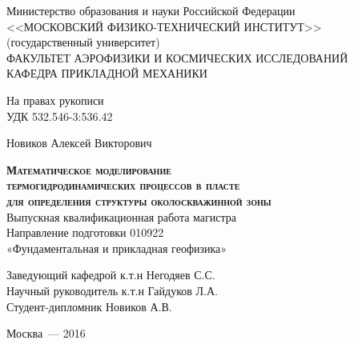 \begin{titlepage}
\newpage

\begin{center}
	Министерство образования и науки Российской Федерации \\
	<<МОСКОВСКИЙ ФИЗИКО-ТЕХНИЧЕСКИЙ ИНСТИТУТ>>\\(государственный университет)\\[0.5cm]
	ФАКУЛЬТЕТ АЭРОФИЗИКИ И КОСМИЧЕСКИХ ИССЛЕДОВАНИЙ\\
	КАФЕДРА ПРИКЛАДНОЙ МЕХАНИКИ\\
\end{center}

\vspace{0.5em}

\begin{flushright}
На правах рукописи \\
УДК 532.546-3:536.42
\end{flushright}

\vspace{1em}

\begin{center}
	Новиков Алексей Викторович
\end{center}

\vspace{0.5em}

\begin{center}
	\textsc{\textbf{Математическое моделирование\\ 
		термогидродинамических процессов в пласте\\
		для определения структуры околоскважинной зоны}}\\[1cm]
	Выпускная квалификационная работа магистра\\
	Направление подготовки 010922\\
	«Фундаментальная и прикладная геофизика»\\
\end{center}

\vspace{2em}

\begin{flushleft}
	Заведующий кафедрой \hrulefill к.т.н Негодяев С.С.\\[0.5cm]
	Научный руководитель \hrulefill к.т.н Гайдуков Л.А.\\[0.5cm]
	Студент-дипломник \hrulefill Новиков А.В.\\
\end{flushleft}

\vspace{\fill}
\begin{center}
Москва~--- 2016
\end{center}

\end{titlepage}